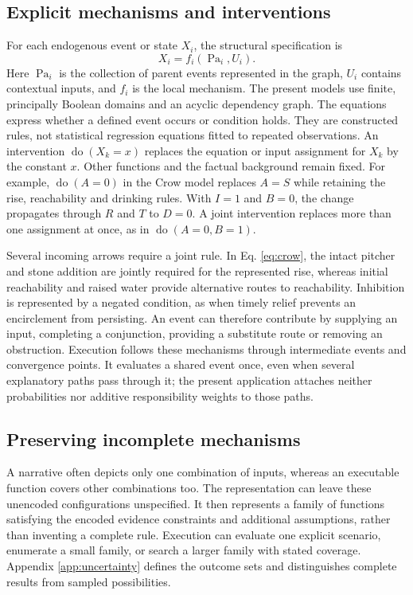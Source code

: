 \documentclass{svproc}
\newcommand{\doop}{\operatorname{do}}
\newcommand{\Pa}{\operatorname{Pa}}
\begin{document}
\subsection{Explicit mechanisms and interventions}
For each endogenous event or state $X_i$, the structural specification is
\begin{equation}\label{eq:scm}
 X_i=f_i(\Pa_i,U_i).
\end{equation}
Here $\Pa_i$ is the collection of parent events represented in the graph, $U_i$ contains contextual inputs, and $f_i$ is the local mechanism. The present models use finite, principally Boolean domains and an acyclic dependency graph. The equations express whether a defined event occurs or condition holds. They are constructed rules, not statistical regression equations fitted to repeated observations.
An intervention $\doop(X_k=x)$ replaces the equation or input assignment for $X_k$ by the constant $x$. Other functions and the factual background remain fixed. For example, $\doop(A=0)$ in the Crow model replaces $A=S$ while retaining the rise, reachability and drinking rules. With $I=1$ and $B=0$, the change propagates through $R$ and $T$ to $D=0$. A joint intervention replaces more than one assignment at once, as in $\doop(A=0,B=1)$.

Several incoming arrows require a joint rule. In Eq. \ref{eq:crow}, the intact pitcher and stone addition are jointly required for the represented rise, whereas initial reachability and raised water provide alternative routes to reachability. Inhibition is represented by a negated condition, as when timely relief prevents an encirclement from persisting. An event can therefore contribute by supplying an input, completing a conjunction, providing a substitute route or removing an obstruction. Execution follows these mechanisms through intermediate events and convergence points. It evaluates a shared event once, even when several explanatory paths pass through it; the present application attaches neither probabilities nor additive responsibility weights to those paths.



\subsection{Preserving incomplete mechanisms}
A narrative often depicts only one combination of inputs, whereas an executable function covers other combinations too. The representation can leave these unencoded configurations unspecified. It then represents a family of functions satisfying the encoded evidence constraints and additional assumptions, rather than inventing a complete rule. Execution can evaluate one explicit scenario, enumerate a small family, or search a larger family with stated coverage. Appendix \ref{app:uncertainty} defines the outcome sets and distinguishes complete results from sampled possibilities.
\end{document}
